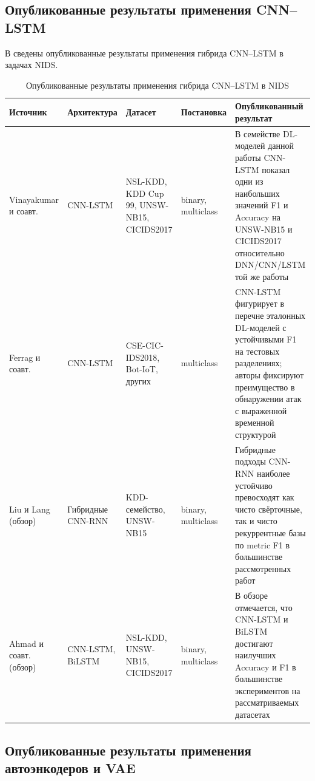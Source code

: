 \subsection{Опубликованные результаты применения CNN--LSTM}

В  сведены опубликованные результаты применения
гибрида CNN--LSTM в задачах NIDS.

\begin{table}[H]
\centering
\caption{Опубликованные результаты применения гибрида CNN--LSTM в NIDS}
\label{tab:cnnlstm-results}
\renewcommand{\arraystretch}{1.25}
\setlength{\tabcolsep}{4pt}
\small
\begin{tabularx}{\linewidth}{@{}lXlXX@{}}
\toprule
\textbf{Источник} & \textbf{Архитектура} & \textbf{Датасет} &
\textbf{Постановка} & \textbf{Опубликованный результат} \\
\midrule
Vinayakumar и соавт.~\cite{vinayakumar2019dl} &
CNN-LSTM &
NSL-KDD, KDD Cup 99, UNSW-NB15, CICIDS2017 &
binary, multiclass &
В семействе DL-моделей данной работы CNN-LSTM показал одни из
наибольших значений F1 и Accuracy на UNSW-NB15 и CICIDS2017
относительно DNN/CNN/LSTM той же работы \\
\addlinespace
Ferrag и соавт.~\cite{ferrag2020dlcyber} &
CNN-LSTM &
CSE-CIC-IDS2018, Bot-IoT, других &
multiclass &
CNN-LSTM фигурирует в перечне эталонных DL-моделей с устойчивыми F1 на
тестовых разделениях; авторы фиксируют преимущество в обнаружении атак с
выраженной временной структурой \\
\addlinespace
Liu и Lang~\cite{liu2019survey} (обзор) &
Гибридные CNN-RNN &
KDD-семейство, UNSW-NB15 &
binary, multiclass &
Гибридные подходы CNN-RNN наиболее устойчиво превосходят как чисто
свёрточные, так и чисто рекуррентные базы по metric F1 в большинстве
рассмотренных работ \\
\addlinespace
Ahmad и соавт.~\cite{ahmad2021nids} (обзор) &
CNN-LSTM, BiLSTM &
NSL-KDD, UNSW-NB15, CICIDS2017 &
binary, multiclass &
В обзоре отмечается, что CNN-LSTM и BiLSTM достигают наилучших Accuracy и F1
в большинстве экспериментов на рассматриваемых датасетах \\
\bottomrule
\end{tabularx}
\end{table}

\subsection{Опубликованные результаты применения автоэнкодеров и VAE}

